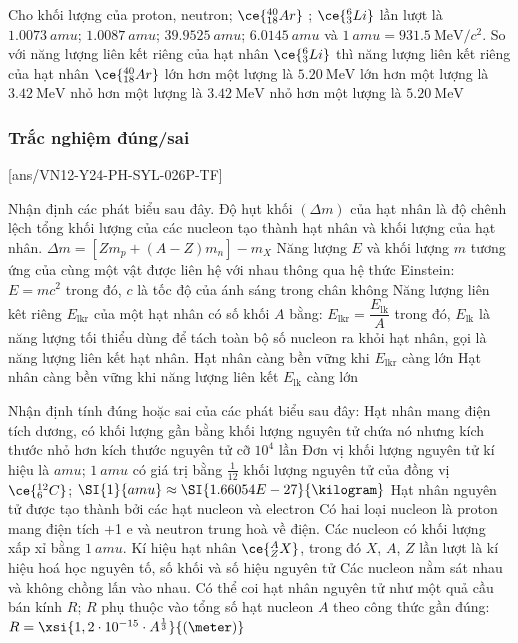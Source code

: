 \begin{ex}
	Cho khối lượng của proton, neutron; $\ce{_{18}^{40}Ar}$ ; $\ce{_3^6Li}$ lần lượt là $\SI{1.0073}{amu}$; $\SI{1.0087}{amu}$; $\SI{39.9525}{amu}$; $\SI{6.0145}{amu}$ và $\SI{1}{amu}=\SI{931.5}{\mega\electronvolt/c^2}$. So với năng lượng liên kết riêng của hạt nhân $\ce{_3^6Li}$ thì năng lượng liên kết riêng của hạt nhân $\ce{_{18}^{40}Ar}$	
	\choice
	{lớn hơn một lượng là $\SI{5.20}{\mega\electronvolt}$}
	{\True lớn hơn một lượng là $\SI{3.42}{\mega\electronvolt}$}
	{nhỏ hơn một lượng là $\SI{3.42}{\mega\electronvolt}$}
	{nhỏ hơn một lượng là $\SI{5.20}{\mega\electronvolt}$}
	\loigiai{}
\end{ex}
\subsubsection{Trắc nghiệm đúng/sai}
\setcounter{ex}{0}
[ans/VN12-Y24-PH-SYL-026P-TF]
\begin{ex}
	Nhận định các phát biểu sau đây.
	\choiceTFt
	{\True Độ hụt khối $\left(\Delta m\right)$ của hạt nhân là độ chênh lệch tổng khối lượng của các nucleon tạo thành hạt nhân và khối lượng của hạt nhân. $\Delta m=\left[Zm_{p}+\left(A-Z\right) m_{n}\right]-m_{X}$
	}
	{\True Năng lượng $E$ và khối lượng $m$ tương ứng của cùng một vật được liên hệ với nhau thông qua hệ thức Einstein: $E=mc^2$ trong đó, $c$ là tốc độ của ánh sáng trong chân không}
	{\True Năng lượng liên kêt riêng $E_{\text{lkr}}$ của một hạt nhân có số khối $A$ bằng: $E_{\text{lkr}}=\dfrac{E_{\text{lk}}}{A}$ trong đó, $E_{\text{lk}}$ là năng lượng tối thiểu dùng để tách toàn bộ số nucleon ra khỏi hạt nhân, gọi là năng lượng liên kết hạt nhân. Hạt nhân càng bền vững khi $E_{\text{lkr}}$ càng lớn}
	{Hạt nhân càng bền vững khi năng lượng liên kết $E_{\text{lk}}$ càng lớn}
	
	\loigiai{}
\end{ex}
\begin{ex}
	Nhận định tính đúng hoặc sai của các phát biểu sau đây:
	\choiceTFt
	{\True Hạt nhân mang điện tích dương, có khối lượng gần bằng khối lượng nguyên tử chứa nó nhưng kích thước nhỏ hơn kích thước nguyên tử cỡ $10^4$ lần}
	{\True Đơn vị khối lượng nguyên tử kí hiệu là $\si{amu}$; $\SI{1}{amu}$ có giá trị bằng $\frac{1}{12}$ khối lượng nguyên tử của đồng vị $\ce{_6^{12}C}$; $\SI{1}{amu}\approx \SI{1.66054E-27}{\kilogram}$}
	{Hạt nhân nguyên tử được tạo thành bởi các hạt nucleon và electron}
	{\True Có hai loại nucleon là proton mang điện tích +1 e và neutron trung hoà về điện. Các nucleon có khối lượng xấp xỉ bằng $\SI{1}{amu}$.
	}
	{\True Kí hiệu hạt nhân $\ce{^A_ZX}$, trong đó $X$, $A$, $Z$ lần lượt là kí hiệu hoá học nguyên tố, số khối và số hiệu nguyên tử
	}
	{\True Các nucleon nằm sát nhau và không chồng lấn vào nhau. Có thể coi hạt nhân nguyên tử như một quả cầu bán kính $R$; $R$ phụ thuộc vào tổng số hạt nucleon $A$ theo công thức gần đúng: $R=\xsi{1,2 \cdot 10^{-15} \cdot A^{\frac{1}{3}}}{\left(\meter\right)}$
	}
	\loigiai{}
\end{ex}

